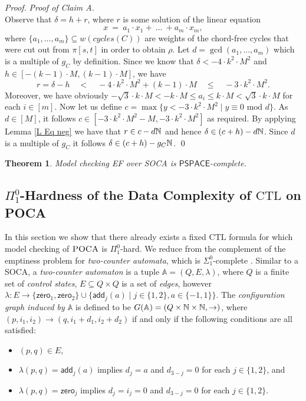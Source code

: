 \documentclass[times,envcountsame]{llncs}
\newtheorem{theorem}{{\bf Theorem}}[section]
\def\CTL{{\text{CTL}}}
\def\PSPACE{{\mathsf{PSPACE}}}
\newcommand{\add}[1]{\ensuremath{\mathsf{add}(#1)}}
\newcommand{\zero}{\ensuremath{\mathsf{zero}}}
\newcommand{\poca}{\textsc{POCA} }
\begin{document}
\begin{proof}
\smallskip

\noindent
{\em Proof of Claim A.}\\
\noindent
Observe that $\delta=h+r$, where $r$ is some solution
of the linear equation
$$
x\ =\ a_1\cdot x_1+\ \ldots\ +a_m\cdot x_m,
$$
where $\{a_1,\ldots, a_m\}\subseteq w(cycles(C))$ are weights of the chord-free cycles that
were cut out from $\pi[s,t]$ in order to obtain $\rho$. %
Let $d=\gcd(a_1,\ldots,a_m)$ which is a multiple of $g_C$ by definition.
Since we know that $\delta<-4\cdot k^2\cdot M^2$ and $h\in[-(k-1)\cdot M,(k-1)\cdot M]$, we have
$$
r=\delta-h\quad<\quad-4\cdot k^2\cdot M^2+(k-1)\cdot M\quad\leq\quad -3\cdot k^2\cdot M^2.
$$
Moreover, we have obviously $-\sqrt{3}\cdot k\cdot M<-k\cdot M\leq a_i\leq
k\cdot M<\sqrt{3}\cdot k\cdot M$ for each $i\in[m]$.
Now let us define $c=\max\{y<-3\cdot k^2\cdot M^2\mid y\equiv 0\text{ mod }
d\}$.
As $d\in[M]$, it follows $c\in[-3\cdot k^2\cdot M^2-M,-3\cdot k^2\cdot M^2]$ as
required.
By applying Lemma \ref{L Eq neg} we have that $r\in c-d\mathbb{N}$ and hence
$\delta\in (c+h)-d\mathbb{N}$.
Since $d$ is a multiple of $g_C$
it follows $\delta\in (c+h)-g_C\mathbb{N}$.
\qed
\end{proof}

\begin{theorem}
Model checking EF over SOCA is $\PSPACE$-complete.
\end{theorem}

\fi

\newcommand{\Two}{\mathbb{A}}
\renewcommand{\add}{\mathsf{add}}

\subsection{$\Pi^0_1$-Hardness of the Data Complexity of $\CTL$ on POCA}{\label{S CTL und}}
In this section we show that there already
exists a fixed $\CTL$ formula for which model checking of
$\poca$ is $\Pi^0_1$-hard.
We reduce from the complement of the emptiness problem for
\emph{two-counter automata}, which is $\Sigma^0_1$-complete \cite{Min61}.
Similar to a
SOCA, a {\em two-counter automaton} is a tuple $\Two=(Q, E, \lambda)$,
where $Q$ is a finite set of {\em control states},
$E\subseteq Q\times Q$ is a set of {\em edges},
 however
$\lambda: E \rightarrow \{\zero_1,\zero_2\}\cup \{\add_j(a)\mid j\in \{1,2\}, a\in
\{-1,1\} \}$. The {\em configuration graph induced by $\Two$} is defined
to be $G(\mathbb{A})=(Q\times \mathbb{N}\times \mathbb{N}, \rightarrow)$, where
$(p,i_1,i_2)\rightarrow (q,i_1+d_1,i_2+d_2)$ if and only if
the following conditions are all satisfied:
\begin{itemize}
\item $(p,q)\in E$,
\item $\lambda(p,q)=\add_j(a)$ implies $d_j=a$ and $d_{3-j}=0$ for each
$j\in\{1,2\}$, and
\item $\lambda(p,q)=\zero_j$ implies $d_j=i_j=0$ and $d_{3-j}=0$ for each
$j\in\{1,2\}$.
\end{itemize}
\end{document}
